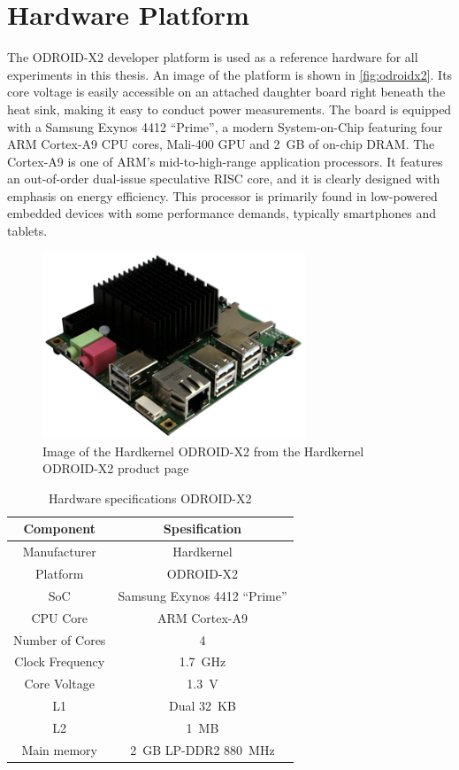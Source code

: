 \section{Hardware Platform}

The ODROID-X2 developer platform \cite{hardkernelodroidx2} is used as a
reference hardware for all experiments in this thesis. An image of the platform
is shown in \autoref{fig:odroidx2}. Its core voltage is easily accessible on an
attached daughter board right beneath the heat sink, making it easy to conduct
power measurements. The board is equipped with a Samsung Exynos 4412 ``Prime'',
a modern System-on-Chip featuring four ARM Cortex-A9 CPU cores, Mali-400 GPU and
2~GB of on-chip DRAM. The Cortex-A9 is one of ARM's mid-to-high-range application
processors. It features an out-of-order dual-issue speculative RISC core, and it
is clearly designed with emphasis on energy efficiency. This processor is
primarily found in low-powered embedded devices with some performance demands,
typically smartphones and tablets.

\begin{figure}[bth]
    \centering
    \includegraphics[width=0.7\textwidth]{figs/odroid.jpg}
    \caption{Image of the Hardkernel ODROID-X2 from the Hardkernel ODROID-X2 product page \cite{hardkernelodroidx2}}
    \label{fig:odroidx2}
\end{figure}

\begin{table}
    \centering
    \begin{tabular}{|c|c|}
        \hline
        Component      & Spesification\\
        \hline
        Manufacturer   & Hardkernel \\
        Platform       & ODROID-X2 \\
        SoC            & Samsung Exynos 4412 ``Prime'' \\
        CPU Core       & ARM Cortex-A9 \\
        Number of Cores& 4 \\
        Clock Frequency& 1.7~GHz \\
        Core Voltage   & 1.3~V \\
        L1             & Dual 32~KB \\
        L2             & 1~MB \\
        Main memory    & 2~GB LP-DDR2 880~MHz \\
        \hline
    \end{tabular}
    \caption{Hardware specifications ODROID-X2}
    \label{tab:hwspecx2}
\end{table}

